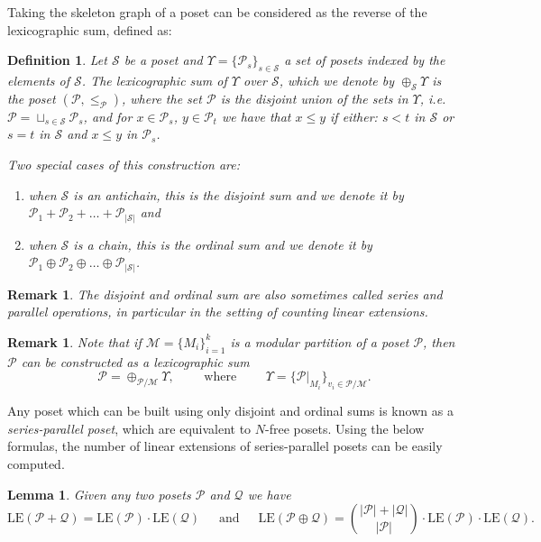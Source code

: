 \documentclass[9pt,a4paper,oneside]{article}
\newtheorem{lemma}[theorem]{Lemma}
\newtheorem{remark}[theorem]{Remark}
\newtheorem{definition}[theorem]{Definition}
\newcommand{\cM}{\mathcal{M}}
\newcommand{\cQ}{\mathcal{Q}}
\newcommand{\cP}{\mathcal{P}}
\newcommand{\cS}{\mathcal{S}}
\newcommand{\lex}{\mathrm{LE}}
\begin{document}
Taking the skeleton graph of a poset can be considered as the reverse of the lexicographic sum, defined as:

\begin{definition}
Let $\cS$ be a poset and $\Upsilon=\{\cP_s \}_{s\in \cS}$ a set of posets indexed by the elements of $\cS$.  The \emph{lexicographic sum of $\Upsilon$ over $\cS$}, which we denote by $\oplus_\cS \Upsilon$ is the poset $(\cP,\leq_\cP)$, where the set $\cP$ is the disjoint union of the sets in $\Upsilon$, i.e. $\cP=\sqcup_{s\in\cS}\cP_s$, and for $x\in\cP_s$, $y\in\cP_t$ we have that $x\leq y$ if either: 
$s<t$ in $\cS$ or
$s=t$ in $\cS$ and $x\leq y$ in $\cP_s$.

Two special cases of this construction are:
\begin{enumerate}
\item when $\cS$ is an antichain, this is the \emph{disjoint sum} and we denote it by $\cP_1+\cP_2+ \ldots +\cP_{|\cS|}$ and 
\item when $\cS$ is a chain, this is the \emph{ordinal sum} and we denote it by $\cP_1\oplus\cP_2\oplus\ldots \oplus\cP_{|\cS|}$.
\end{enumerate}
\end{definition}

\begin{remark}
The disjoint and ordinal sum are also sometimes called \emph{series} and \emph{parallel} operations, in particular in the setting of counting linear extensions.
\end{remark}

\begin{remark}
Note that if $\cM=\{ M_i\}_{i=1}^k$ is a modular partition of a poset $\cP$, then $\cP$ can be constructed as a lexicographic sum 
\[\cP=\oplus_{\cP/\cM} \Upsilon, \quad\quad \text{ where } \quad\quad \Upsilon=\{\cP|_{M_i} \}_{v_i\in \cP/\cM}.\]
\end{remark}

Any poset which can be built using only disjoint and ordinal sums is known as a \emph{series-parallel poset}, which are equivalent to $N$-free posets.
 Using the below formulas, the number of linear extensions of series-parallel posets can be easily computed. 
 

\begin{lemma}\cite[Example 3.5.4]{Sta11}\label{lem:sums}
Given any two posets $\cP$ and $\cQ$ we have
$$\lex(\cP+\cQ)=\lex(\cP)\cdot\lex(\cQ)\,\,\,\,\,\,\,\,\,\text{and}\,\,\,\,\,\,\,\,\,\lex(\cP\oplus\cQ)=\binom{|\cP|+|\cQ|}{|\cP|}\cdot\lex(\cP)\cdot\lex(\cQ).$$
\end{lemma}
\end{document}
